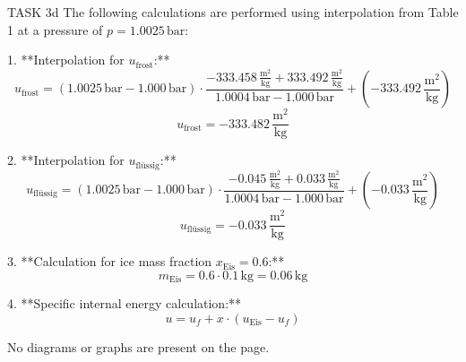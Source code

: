 TASK 3d  
The following calculations are performed using interpolation from Table 1 at a pressure of \( p = 1.0025 \, \text{bar} \):  

1. **Interpolation for \( u_{\text{frost}} \):**  
\[
u_{\text{frost}} = (1.0025 \, \text{bar} - 1.000 \, \text{bar}) \cdot \frac{-333.458 \, \frac{\text{m}^2}{\text{kg}} + 333.492 \, \frac{\text{m}^2}{\text{kg}}}{1.0004 \, \text{bar} - 1.000 \, \text{bar}} + (-333.492 \, \frac{\text{m}^2}{\text{kg}})
\]  
\[
u_{\text{frost}} = -333.482 \, \frac{\text{m}^2}{\text{kg}}
\]  

2. **Interpolation for \( u_{\text{flüssig}} \):**  
\[
u_{\text{flüssig}} = (1.0025 \, \text{bar} - 1.000 \, \text{bar}) \cdot \frac{-0.045 \, \frac{\text{m}^2}{\text{kg}} + 0.033 \, \frac{\text{m}^2}{\text{kg}}}{1.0004 \, \text{bar} - 1.000 \, \text{bar}} + (-0.033 \, \frac{\text{m}^2}{\text{kg}})
\]  
\[
u_{\text{flüssig}} = -0.033 \, \frac{\text{m}^2}{\text{kg}}
\]  

3. **Calculation for ice mass fraction \( x_{\text{Eis}} = 0.6 \):**  
\[
m_{\text{Eis}} = 0.6 \cdot 0.1 \, \text{kg} = 0.06 \, \text{kg}
\]  

4. **Specific internal energy calculation:**  
\[
u = u_f + x \cdot (u_{\text{Eis}} - u_f)
\]  

No diagrams or graphs are present on the page.